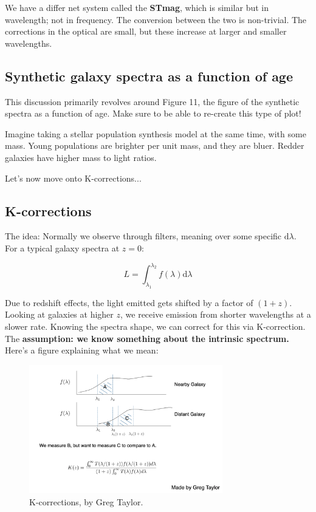 \documentclass{article}
\begin{document}
We have a differ net system called the \textbf{STmag}, which is similar but in wavelength; not in frequency. The conversion between the two is non-trivial. The corrections in the optical are small, but these increase at larger and smaller wavelengths. 

\subsection{Synthetic galaxy spectra as a function of age}

This discussion primarily revolves around Figure 11, the figure of the synthetic spectra as a function of age. Make sure to be able to re-create this type of plot!

Imagine taking a stellar population synthesis model at the same time, with some mass. Young populations are brighter per unit mass, and they are bluer. Redder galaxies have higher mass to light ratios. 

Let's now move onto K-corrections...

\subsection{K-corrections}

The idea: Normally we observe through filters, meaning over some specific $\mathrm{d}\lambda$. For a typical galaxy spectra at $z=0$:

\begin{equation}
    L = \int_{\lambda_1}^{\lambda_2} f(\lambda) \mathrm{d}\lambda 
\end{equation}

Due to redshift effects, the light emitted gets shifted by a factor of $(1+z)$. Looking at galaxies at higher $z$, we receive emission from shorter wavelengths at a slower rate. Knowing the spectra shape, we can correct for this via K-correction. The \textbf{assumption: we know something about the intrinsic spectrum.} Here's a figure explaining what we mean:

\begin{figure}[h]
    \centering
    \includegraphics[width=0.75\textwidth]{figs/Screen Shot 2021-09-02 at 9.40.32 AM.png}
    \caption{K-corrections, by Greg Taylor.}
    \label{fig:kcorr}
\end{figure}
\end{document}
